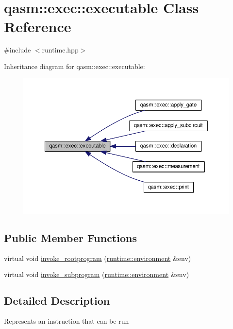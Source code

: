 \hypertarget{classqasm_1_1exec_1_1executable}{}\section{qasm\+:\+:exec\+:\+:executable Class Reference}
\label{classqasm_1_1exec_1_1executable}


{\ttfamily \#include $<$runtime.\+hpp$>$}



Inheritance diagram for qasm\+:\+:exec\+:\+:executable\+:\nopagebreak
\begin{figure}[H]
\begin{center}
\leavevmode
\includegraphics[width=350pt]{classqasm_1_1exec_1_1executable__inherit__graph}
\end{center}
\end{figure}
\subsection*{Public Member Functions}
\begin{DoxyCompactItemize}
\item 
virtual void \hyperlink{classqasm_1_1exec_1_1executable_ad07f864a889edb0777ebbb1bc1628121}{invoke\+\_\+rootprogram} (\hyperlink{classqasm_1_1runtime_1_1environment}{runtime\+::environment} \&env)
\item 
virtual void \hyperlink{classqasm_1_1exec_1_1executable_ad73a67bcb74196954455b45804944544}{invoke\+\_\+subprogram} (\hyperlink{classqasm_1_1runtime_1_1environment}{runtime\+::environment} \&env)
\end{DoxyCompactItemize}


\subsection{Detailed Description}
Represents an instruction that can be run 

